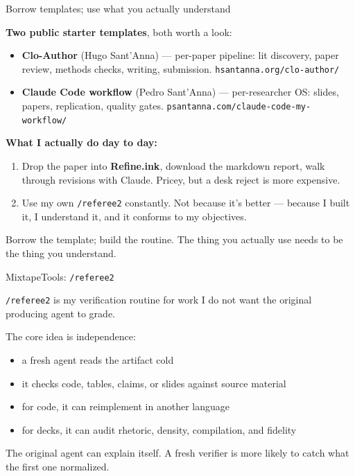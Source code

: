 \documentclass[aspectratio=169,11pt]{beamer}
\begin{document}
\begin{frame}[shrink=8]{Borrow templates; use what you actually understand}

\small
\textbf{Two public starter templates}, both worth a look:

\begin{itemize}\setlength\itemsep{0.08em}
    \item \textbf{Clo-Author} (Hugo Sant'Anna) --- per-paper pipeline: lit discovery, paper review, methods checks, writing, submission. {\scriptsize \texttt{hsantanna.org/clo-author/}}
    \item \textbf{Claude Code workflow} (Pedro Sant'Anna) --- per-researcher OS: slides, papers, replication, quality gates. {\scriptsize \texttt{psantanna.com/claude-code-my-workflow/}}
\end{itemize}

\vspace{0.2cm}

\textbf{What I actually do day to day:}
\begin{enumerate}\setlength\itemsep{0.08em}
    \item Drop the paper into \textbf{Refine.ink}, download the markdown report, walk through revisions with Claude. Pricey, but a desk reject is more expensive.
    \item Use my own \texttt{/referee2} constantly. Not because it's better --- because I built it, I understand it, and it conforms to my objectives.
\end{enumerate}

\vspace{0.15cm}

\alert{Borrow the template; build the routine. The thing you actually use needs to be the thing you understand.}

\end{frame}

\begin{frame}{MixtapeTools: \texttt{/referee2}}

\texttt{/referee2} is my verification routine for work I do not want the original producing agent to grade.

\vspace{0.3cm}

The core idea is independence:

\begin{itemize}\setlength\itemsep{0.35em}
    \item a fresh agent reads the artifact cold
    \item it checks code, tables, claims, or slides against source material
    \item for code, it can reimplement in another language
    \item for decks, it can audit rhetoric, density, compilation, and fidelity
\end{itemize}

\vspace{0.35cm}

\alert{The original agent can explain itself. A fresh verifier is more likely to catch what the first one normalized.}

\end{frame}
\end{document}
